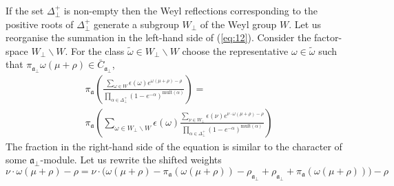 \documentclass[a4paper,12pt]{article}
\theoremstyle{definition} \newtheorem{Def}{Definition}
\begin{document}
If the set $\Delta^{+}_{\bot}$ is non-empty then the Weyl reflections corresponding to the positive roots of $\Delta^{+}_{\bot}$ generate a subgroup $W_{\bot}$ of the Weyl group $W$.
Let us reorganise the summation in the left-hand side of (\ref{eq:12}).
Consider the factor-space $W_{\bot}\backslash W$. For the class $\tilde{\omega}\in W_{\bot}\backslash W$ choose the representative $\omega \in \tilde{\omega}$ such that $\pi_{\mathfrak{a}_{\bot}}\omega(\mu+\rho)\in \bar{C}_{\mathfrak{a}_{\bot}}$,
\begin{multline}
  \label{eq:13}
 \pi_{\mathfrak{a}}\left(\frac{\sum_{\omega\in W} \epsilon(\omega) e^{\omega(\mu+\rho)-\rho}}{\prod_{\alpha\in\Delta^{+}_{\bot}}(1-e^{-\alpha})^{\mathrm{mult}(\alpha)}}\right) = \\
 \pi_{\mathfrak{a}}\left(\sum_{\omega\in W_{\bot}\backslash W} \epsilon(\omega) \frac{\sum_{\nu\in W_{\bot}}\epsilon(\nu) e^{\nu \cdot \omega(\mu+\rho)-\rho}}{\prod_{\alpha\in\Delta^{+}_{\bot}}(1-e^{-\alpha})^{\mathrm{mult}(\alpha)}}\right)
\end{multline}
The fraction in the right-hand side of the equation is similar to the character of some  $\mathfrak{a}_{\bot}$-module.
Let us rewrite the shifted weights
\begin{equation}
  \label{eq:30}
  \nu\cdot\omega(\mu+\rho)-\rho=\nu\cdot \bigl(\omega(\mu+\rho)-\pi_{\mathfrak{a}}(\omega(\mu+\rho))-\rho_{\mathfrak{a}_{\bot}}+\rho_{\mathfrak{a}_{\bot}}+\pi_{\mathfrak{a}}(\omega(\mu+\rho))\bigr)-\rho
\end{equation}
\end{document}
